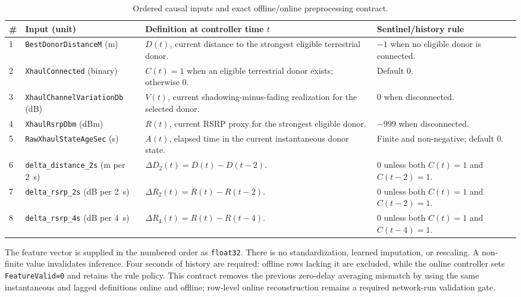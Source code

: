 \begin{table}[t]
\centering
\footnotesize
\caption{Ordered causal inputs and exact offline/online preprocessing contract.}
\label{tab:audited_predictor_features}
\begin{tabular}{p{} p{} p{} p{}}
\hline
\# & Input (unit) & Definition at controller time $t$ & Sentinel/history rule \\
\hline
1 & \texttt{Best\allowbreak Donor\allowbreak Distance\allowbreak M} (m) & $D(t)$, current distance to the strongest eligible terrestrial donor. & $-1$ when no eligible donor is connected. \\
2 & \texttt{Xhaul\allowbreak Connected} (binary) & $C(t)=1$ when an eligible terrestrial donor exists; otherwise 0. & Default 0. \\
3 & \texttt{Xhaul\allowbreak Channel\allowbreak Variation\allowbreak Db} (dB) & $V(t)$, current shadowing-minus-fading realization for the selected donor. & 0 when disconnected. \\
4 & \texttt{Xhaul\allowbreak Rsrp\allowbreak Dbm} (dBm) & $R(t)$, current RSRP proxy for the strongest eligible donor. & $-999$ when disconnected. \\
5 & \texttt{Raw\allowbreak Xhaul\allowbreak State\allowbreak Age\allowbreak Sec} (s) & $A(t)$, elapsed time in the current instantaneous donor state. & Finite and non-negative; default 0. \\
6 & \texttt{delta\_\allowbreak distance\_\allowbreak 2s} (m per 2~s) & $\Delta D_{2}(t)=D(t)-D(t-2)$. & 0 unless both $C(t)=1$ and $C(t-2)=1$. \\
7 & \texttt{delta\_\allowbreak rsrp\_\allowbreak 2s} (dB per 2~s) & $\Delta R_{2}(t)=R(t)-R(t-2)$. & 0 unless both $C(t)=1$ and $C(t-2)=1$. \\
8 & \texttt{delta\_\allowbreak rsrp\_\allowbreak 4s} (dB per 4~s) & $\Delta R_{4}(t)=R(t)-R(t-4)$. & 0 unless both $C(t)=1$ and $C(t-4)=1$. \\
\hline
\end{tabular}

\vspace{2pt}
\begin{minipage}{0.96\textwidth}
\footnotesize
The feature vector is supplied in the numbered order as \texttt{float32}.
There is no standardization, learned imputation, or rescaling.  A non-finite
value invalidates inference.  Four seconds of history are required: offline
rows lacking it are excluded, while the online controller sets
\texttt{Feature\allowbreak Valid=0} and retains the rule policy.  This contract removes the
previous zero-delay averaging mismatch by using the same instantaneous and
lagged definitions online and offline; row-level online reconstruction remains
a required network-run validation gate.
\end{minipage}
\end{table}

